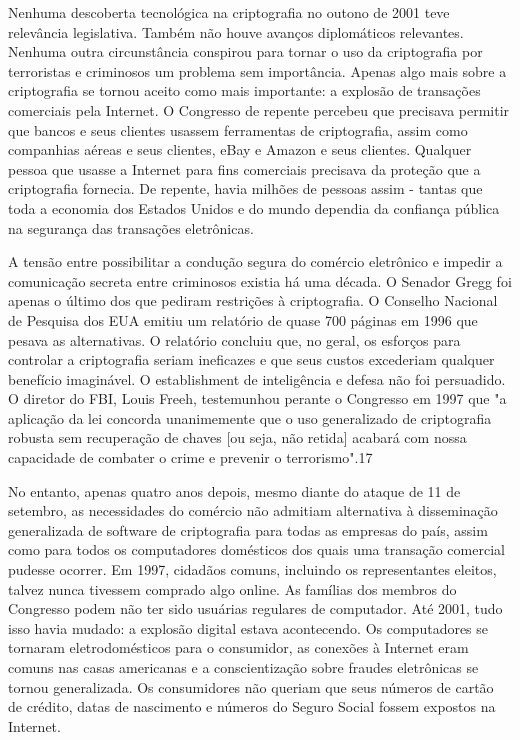 \documentclass{book}
\begin{document}
Nenhuma descoberta tecnológica na criptografia no outono de 2001 teve relevância legislativa. Também não houve avanços diplomáticos relevantes. Nenhuma outra circunstância conspirou para tornar o uso da criptografia por terroristas e criminosos um problema sem importância. Apenas algo mais sobre a criptografia se tornou aceito como mais importante: a explosão de transações comerciais pela Internet. O Congresso de repente percebeu que precisava permitir que bancos e seus clientes usassem ferramentas de criptografia, assim como companhias aéreas e seus clientes, eBay e Amazon e seus clientes. Qualquer pessoa que usasse a Internet para fins comerciais precisava da proteção que a criptografia fornecia. De repente, havia milhões de pessoas assim - tantas que toda a economia dos Estados Unidos e do mundo dependia da confiança pública na segurança das transações eletrônicas.

A tensão entre possibilitar a condução segura do comércio eletrônico e impedir a comunicação secreta entre criminosos existia há uma década. O Senador Gregg foi apenas o último dos que pediram restrições à criptografia. O Conselho Nacional de Pesquisa dos EUA emitiu um relatório de quase 700 páginas em 1996 que pesava as alternativas. O relatório concluiu que, no geral, os esforços para controlar a criptografia seriam ineficazes e que seus custos excederiam qualquer benefício imaginável. O establishment de inteligência e defesa não foi persuadido. O diretor do FBI, Louis Freeh, testemunhou perante o Congresso em 1997 que "a aplicação da lei concorda unanimemente que o uso generalizado de criptografia robusta sem recuperação de chaves [ou seja, não retida] acabará com nossa capacidade de combater o crime e prevenir o terrorismo".17

No entanto, apenas quatro anos depois, mesmo diante do ataque de 11 de setembro, as necessidades do comércio não admitiam alternativa à disseminação generalizada de software de criptografia para todas as empresas do país, assim como para todos os computadores domésticos dos quais uma transação comercial pudesse ocorrer. Em 1997, cidadãos comuns, incluindo os representantes eleitos, talvez nunca tivessem comprado algo online. As famílias dos membros do Congresso podem não ter sido usuárias regulares de computador. Até 2001, tudo isso havia mudado: a explosão digital estava acontecendo. Os computadores se tornaram eletrodomésticos para o consumidor, as conexões à Internet eram comuns nas casas americanas e a conscientização sobre fraudes eletrônicas se tornou generalizada. Os consumidores não queriam que seus números de cartão de crédito, datas de nascimento e números do Seguro Social fossem expostos na Internet.
\end{document}
